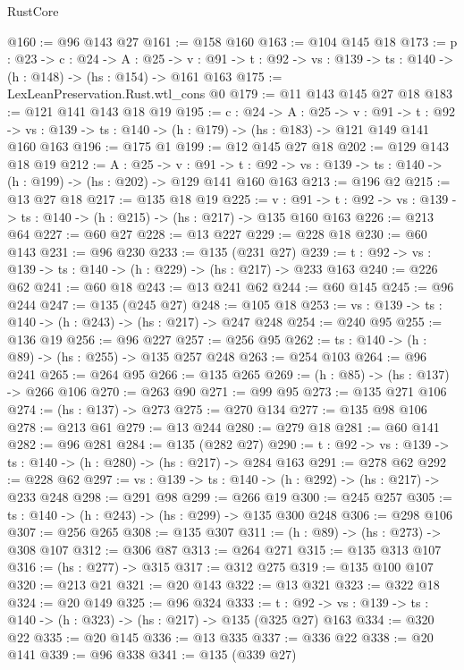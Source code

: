 \begin{lexlean}{RustCore}
\begin{coremodule}
@160 := @96 @143 @27
@161 := @158 @160
@163 := @104 @145 @18
@173 := {p : @23} ->
  {c : @24} ->
  {A : @25} ->
  {v : @91} -> {t : @92} -> {vs : @139} -> {ts : @140} -> (h : @148) -> (hs : @154) -> @161 @163
@175 := LexLeanPreservation.Rust.wtl_cons @0
@179 := @11 @143 @145 @27 @18
@183 := @121 @141 @143 @18 @19
@195 := {c : @24} ->
  {A : @25} ->
  {v : @91} ->
  {t : @92} -> {vs : @139} -> {ts : @140} -> (h : @179) -> (hs : @183) -> @121 @149 @141 @160 @163
@196 := @175 @1
@199 := @12 @145 @27 @18
@202 := @129 @143 @18 @19
@212 := {A : @25} ->
  {v : @91} ->
  {t : @92} -> {vs : @139} -> {ts : @140} -> (h : @199) -> (hs : @202) -> @129 @141 @160 @163
@213 := @196 @2
@215 := @13 @27 @18
@217 := @135 @18 @19
@225 := {v : @91} ->
  {t : @92} -> {vs : @139} -> {ts : @140} -> (h : @215) -> (hs : @217) -> @135 @160 @163
@226 := @213 @64
@227 := @60 @27
@228 := @13 @227
@229 := @228 @18
@230 := @60 @143
@231 := @96 @230
@233 := @135 (@231 @27)
@239 := {t : @92} -> {vs : @139} -> {ts : @140} -> (h : @229) -> (hs : @217) -> @233 @163
@240 := @226 @62
@241 := @60 @18
@243 := @13 @241 @62
@244 := @60 @145
@245 := @96 @244
@247 := @135 (@245 @27)
@248 := @105 @18
@253 := {vs : @139} -> {ts : @140} -> (h : @243) -> (hs : @217) -> @247 @248
@254 := @240 @95
@255 := @136 @19
@256 := @96 @227
@257 := @256 @95
@262 := {ts : @140} -> (h : @89) -> (hs : @255) -> @135 @257 @248
@263 := @254 @103
@264 := @96 @241
@265 := @264 @95
@266 := @135 @265
@269 := (h : @85) -> (hs : @137) -> @266 @106
@270 := @263 @90
@271 := @99 @95
@273 := @135 @271 @106
@274 := (hs : @137) -> @273
@275 := @270 @134
@277 := @135 @98 @106
@278 := @213 @61
@279 := @13 @244
@280 := @279 @18
@281 := @60 @141
@282 := @96 @281
@284 := @135 (@282 @27)
@290 := {t : @92} -> {vs : @139} -> {ts : @140} -> (h : @280) -> (hs : @217) -> @284 @163
@291 := @278 @62
@292 := @228 @62
@297 := {vs : @139} -> {ts : @140} -> (h : @292) -> (hs : @217) -> @233 @248
@298 := @291 @98
@299 := @266 @19
@300 := @245 @257
@305 := {ts : @140} -> (h : @243) -> (hs : @299) -> @135 @300 @248
@306 := @298 @106
@307 := @256 @265
@308 := @135 @307
@311 := (h : @89) -> (hs : @273) -> @308 @107
@312 := @306 @87
@313 := @264 @271
@315 := @135 @313 @107
@316 := (hs : @277) -> @315
@317 := @312 @275
@319 := @135 @100 @107
@320 := @213 @21
@321 := @20 @143
@322 := @13 @321
@323 := @322 @18
@324 := @20 @149
@325 := @96 @324
@333 := {t : @92} -> {vs : @139} -> {ts : @140} -> (h : @323) -> (hs : @217) -> @135 (@325 @27) @163
@334 := @320 @22
@335 := @20 @145
@336 := @13 @335
@337 := @336 @22
@338 := @20 @141
@339 := @96 @338
@341 := @135 (@339 @27)

\end{coremodule}
\end{lexlean}
